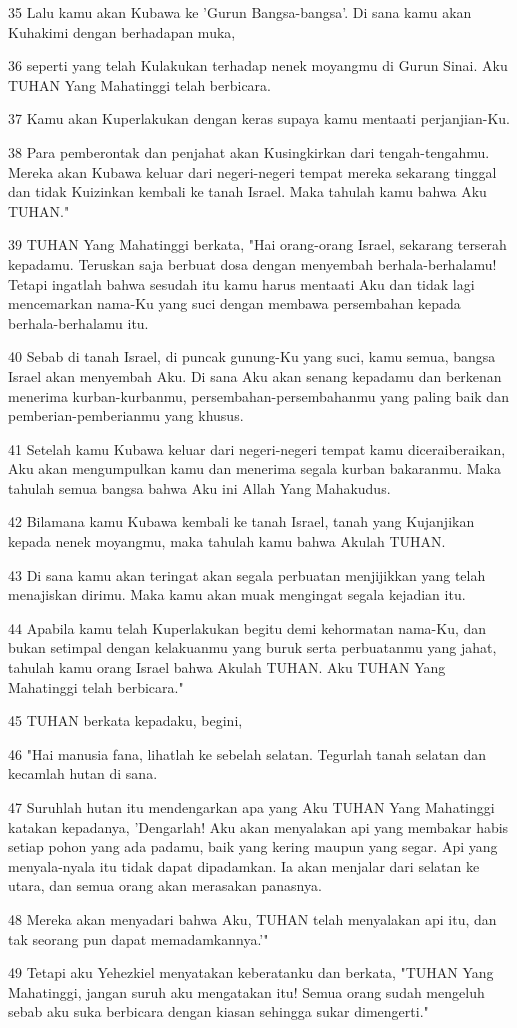 \par 35 Lalu kamu akan Kubawa ke 'Gurun Bangsa-bangsa'. Di sana kamu akan Kuhakimi dengan berhadapan muka,
\par 36 seperti yang telah Kulakukan terhadap nenek moyangmu di Gurun Sinai. Aku TUHAN Yang Mahatinggi telah berbicara.
\par 37 Kamu akan Kuperlakukan dengan keras supaya kamu mentaati perjanjian-Ku.
\par 38 Para pemberontak dan penjahat akan Kusingkirkan dari tengah-tengahmu. Mereka akan Kubawa keluar dari negeri-negeri tempat mereka sekarang tinggal dan tidak Kuizinkan kembali ke tanah Israel. Maka tahulah kamu bahwa Aku TUHAN."
\par 39 TUHAN Yang Mahatinggi berkata, "Hai orang-orang Israel, sekarang terserah kepadamu. Teruskan saja berbuat dosa dengan menyembah berhala-berhalamu! Tetapi ingatlah bahwa sesudah itu kamu harus mentaati Aku dan tidak lagi mencemarkan nama-Ku yang suci dengan membawa persembahan kepada berhala-berhalamu itu.
\par 40 Sebab di tanah Israel, di puncak gunung-Ku yang suci, kamu semua, bangsa Israel akan menyembah Aku. Di sana Aku akan senang kepadamu dan berkenan menerima kurban-kurbanmu, persembahan-persembahanmu yang paling baik dan pemberian-pemberianmu yang khusus.
\par 41 Setelah kamu Kubawa keluar dari negeri-negeri tempat kamu diceraiberaikan, Aku akan mengumpulkan kamu dan menerima segala kurban bakaranmu. Maka tahulah semua bangsa bahwa Aku ini Allah Yang Mahakudus.
\par 42 Bilamana kamu Kubawa kembali ke tanah Israel, tanah yang Kujanjikan kepada nenek moyangmu, maka tahulah kamu bahwa Akulah TUHAN.
\par 43 Di sana kamu akan teringat akan segala perbuatan menjijikkan yang telah menajiskan dirimu. Maka kamu akan muak mengingat segala kejadian itu.
\par 44 Apabila kamu telah Kuperlakukan begitu demi kehormatan nama-Ku, dan bukan setimpal dengan kelakuanmu yang buruk serta perbuatanmu yang jahat, tahulah kamu orang Israel bahwa Akulah TUHAN. Aku TUHAN Yang Mahatinggi telah berbicara."
\par 45 TUHAN berkata kepadaku, begini,
\par 46 "Hai manusia fana, lihatlah ke sebelah selatan. Tegurlah tanah selatan dan kecamlah hutan di sana.
\par 47 Suruhlah hutan itu mendengarkan apa yang Aku TUHAN Yang Mahatinggi katakan kepadanya, 'Dengarlah! Aku akan menyalakan api yang membakar habis setiap pohon yang ada padamu, baik yang kering maupun yang segar. Api yang menyala-nyala itu tidak dapat dipadamkan. Ia akan menjalar dari selatan ke utara, dan semua orang akan merasakan panasnya.
\par 48 Mereka akan menyadari bahwa Aku, TUHAN telah menyalakan api itu, dan tak seorang pun dapat memadamkannya.'"
\par 49 Tetapi aku Yehezkiel menyatakan keberatanku dan berkata, "TUHAN Yang Mahatinggi, jangan suruh aku mengatakan itu! Semua orang sudah mengeluh sebab aku suka berbicara dengan kiasan sehingga sukar dimengerti."

